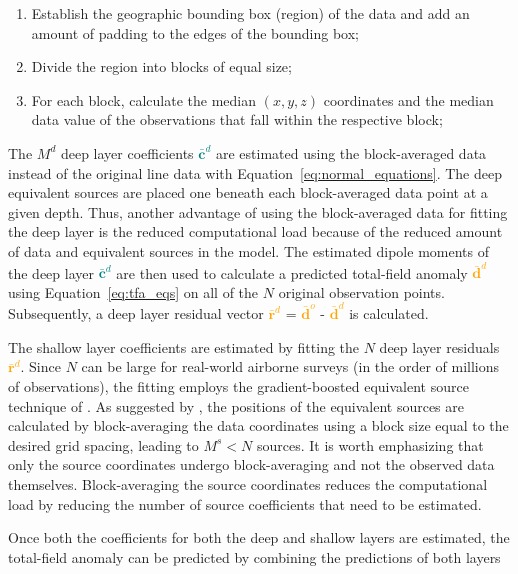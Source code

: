 \begin{enumerate}
  \item Establish the geographic bounding box (region) of the data and add an amount of padding to the edges of the bounding box;
  \item Divide the region into blocks of equal size;
  \item For each block, calculate the median $(x, y, z)$ coordinates and the median data value of the observations that fall within the respective block;
\end{enumerate}

The $M^d$ deep layer coefficients \textcolor{teal}{$\bar{\mathbf{c}}^d$} are estimated using the block-averaged data instead of the original line data with Equation~\ref{eq:normal_equations}.
The deep equivalent sources are placed one beneath each block-averaged data point at a given depth.
Thus, another advantage of using the block-averaged data for fitting the deep layer is the reduced computational load because of the reduced amount of data and equivalent sources in the model.
The estimated dipole moments of the deep layer \textcolor{teal}{$\bar{\mathbf{c}}^d$} are then used to calculate a predicted total-field anomaly \textcolor{orange}{$\bar{\mathbf{d}}^d$} using Equation~\ref{eq:tfa_eqs} on all of the $N$ original observation points.
Subsequently, a deep layer residual vector \textcolor{orange}{$\bar{\mathbf{r}}^d$} = \textcolor{orange}{$\bar{\mathbf{d}}^o$} - \textcolor{orange}{$\bar{\mathbf{d}}^d$} is calculated.

The shallow layer coefficients are estimated by fitting the $N$ deep layer residuals \textcolor{orange}{$\bar{\mathbf{r}}^d$}. 
Since $N$ can be large for real-world airborne surveys (in the order of millions of observations), the fitting employs the gradient-boosted equivalent source technique of \citep{Soler2021}.
As suggested by \citet{Soler2021}, the positions of the equivalent sources are calculated by block-averaging the data coordinates using a block size equal to the desired grid spacing, leading to $M^s < N$ sources.
It is worth emphasizing that only the source coordinates undergo block-averaging and not the observed data themselves.
Block-averaging the source coordinates reduces the computational load by reducing the number of source coefficients that need to be estimated.

Once both the coefficients for both the deep and shallow layers are estimated, the total-field anomaly can be predicted by combining the predictions of both layers

